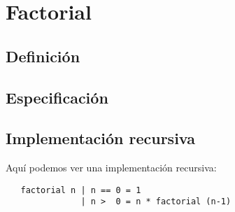 \documentclass{article}
\begin{document}
\section{Factorial}





\subsection{Definición}



\subsection{Especificación}


\subsection{Implementación recursiva}

Aquí podemos ver una implementación recursiva:

\begin{verbatim}
   factorial n | n == 0 = 1
               | n >  0 = n * factorial (n-1)
\end{verbatim}
\end{document}
